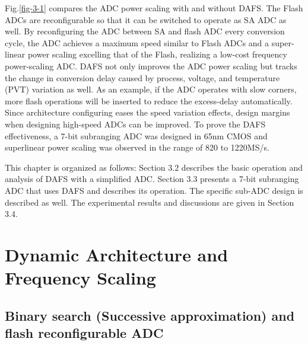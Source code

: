 Fig.\ref{fig-3-1} compares the ADC power scaling with and without DAFS.
The Flash ADCs are reconfigurable so that it can be switched to operate as SA ADC as well.
By reconfiguring the ADC between SA and flash ADC every conversion cycle, the ADC achieves a maximum speed similar to Flash ADCs and a super-linear power scaling excelling that of the Flash, realizing a low-cost frequency power-scaling ADC.
DAFS not only improves the ADC power scaling but tracks the change in conversion delay caused by process, voltage, and temperature (PVT) variation as well.  As an example, if the ADC operates with slow corners, more flash operations will be inserted to reduce the excess-delay automatically. Since architecture configuring eases the speed variation effects, design margins when designing high-speed ADCs can be improved. 
To prove the DAFS effectiveness, a 7-bit subranging ADC was designed in 65nm CMOS and superlinear power scaling was observed in the range of 820 to 1220MS/s. 

This chapter is organized as follows: Section 3.2 describes the basic operation and analysis of DAFS with a simplified ADC. Section 3.3 presents a 7-bit subranging ADC that uses DAFS and describes its operation. The specific sub-ADC design is described as well. The experimental results and discussions are given in Section 3.4. 

\section{Dynamic Architecture and Frequency Scaling}

\subsection{Binary search (Successive approximation) and flash reconfigurable ADC}\label{BFADC}

